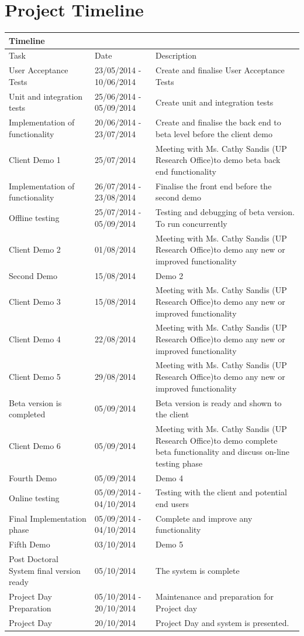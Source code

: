 \documentclass[12pt]{article}
\newcommand{\client}{Ms. Cathy Sandis (UP Research Office)}
\begin{document}
\section{Project Timeline}
\begin{center}
\begin{tabular}{|p{3cm}|p{3cm}|p{9cm}|}
\hline
\multicolumn{3}{|l|}{\bf Timeline} \\
\hline
 Task & Date & Description  \\
\hline
User Acceptance Tests & 23/05/2014 - 10/06/2014 & Create and finalise User Acceptance Tests \\
\hline
Unit and integration tests & 25/06/2014 - 05/09/2014 & Create unit and integration tests \\
\hline
Implementation of functionality & 20/06/2014 - 23/07/2014 & Create and finalise the back end to beta level before the client demo \\
\hline
Client Demo 1 & 25/07/2014 & Meeting with \client to demo beta back end functionality \\
\hline
Implementation of functionality & 26/07/2014 - 23/08/2014 & Finalise the front end before the second demo \\
\hline
Offline testing & 25/07/2014 - 05/09/2014 & Testing and debugging of beta version. To run concurrently \\
\hline
Client Demo 2 & 01/08/2014 & Meeting with \client to demo any new or improved functionality \\
\hline
Second Demo & 15/08/2014 & Demo 2 \\
\hline
Client Demo 3 & 15/08/2014 & Meeting with \client to demo any new or improved functionality  \\
\hline
Client Demo 4 & 22/08/2014 & Meeting with \client to demo any new or improved functionality  \\
\hline
Client Demo 5 & 29/08/2014 & Meeting with \client to demo any new or improved functionality \\
\hline
Beta version is completed & 05/09/2014 & Beta version is ready and shown to the client  \\
\hline
Client Demo 6 & 05/09/2014 & Meeting with \client to demo complete beta functionality and discuss on-line testing phase\\
\hline
Fourth Demo & 05/09/2014 & Demo 4 \\
\hline
Online testing & 05/09/2014 - 04/10/2014 & Testing with the client and potential end users \\
\hline
Final Implementation phase & 05/09/2014 - 04/10/2014 & Complete and improve any functionality\\
\hline
Fifth Demo & 03/10/2014 & Demo 5 \\
\hline
Post Doctoral System final version ready & 05/10/2014 & The system is complete \\
\hline
Project Day Preparation & 05/10/2014 - 20/10/2014 & Maintenance and preparation for Project day  \\
\hline
Project Day & 20/10/2014 & Project Day and system is presented. \\
\hline



\end{tabular}
\end{center}
\end{document}
